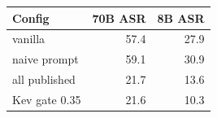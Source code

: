 \par\medskip\noindent\begin{minipage}{\columnwidth}\centering{}\label{tab:a3}\footnotesize
\begin{tabular}{lrr}\toprule
Config & 70B ASR & 8B ASR \\ \midrule
vanilla & 57.4 & 27.9 \\
naive prompt & 59.1 & 30.9 \\
all published & 21.7 & 13.6 \\
Kev gate 0.35 & 21.6 & 10.3 \\
\bottomrule\end{tabular}\end{minipage}\par\medskip

